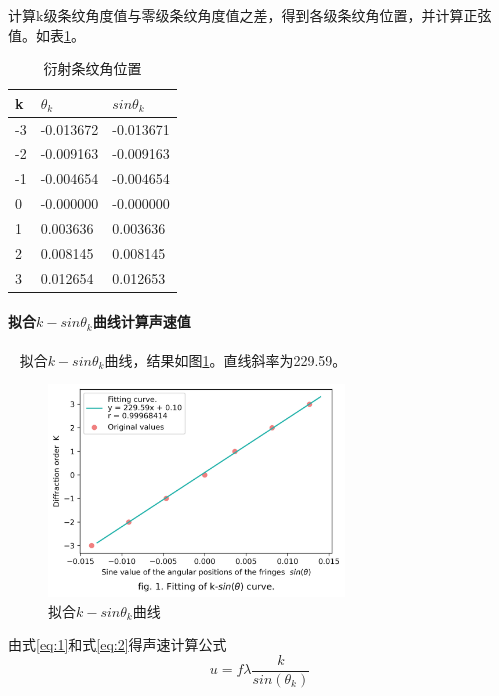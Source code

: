 \documentclass[12pt,a4paper,UTF8]{ctexart}
\begin{document}
		计算k级条纹角度值与零级条纹角度值之差，得到各级条纹角位置，并计算正弦值。如表\ref{tab:2}。
		\begin{table}[htbp]
			\centering
			\begin{tabular}{|l|l|l|}
			\hline
				k & $\theta_k$ & $sin\theta_k$ \\ \hline
				-3 & -0.013672 & -0.013671 \\ \hline
				-2 & -0.009163 & -0.009163 \\ \hline
				-1 & -0.004654 & -0.004654 \\ \hline
				0 & -0.000000 & -0.000000 \\ \hline
				1 & 0.003636 & 0.003636 \\ \hline
				2 & 0.008145 & 0.008145 \\ \hline
				3 & 0.012654 & 0.012653 \\ \hline
			\end{tabular}
			\caption{衍射条纹角位置}
			\label{tab:2}
		\end{table}
		
		\paragraph{拟合$k-sin\theta_k$曲线计算声速值}~
		\newline
		\indent
		拟合$k-sin\theta_k$曲线，结果如图\ref{fig:1}。直线斜率为229.59。
		\begin{figure}[htbp]
			\centering
			\includegraphics[width=0.7\textwidth]{attachments/fig.1.png}
			\caption{拟合$k-sin\theta_k$曲线}
			\label{fig:1}
		\end{figure}
		
		由式\ref{eq:1}和式\ref{eq:2}得声速计算公式
		\begin{equation}\label{eq:5}
			u = f\lambda\frac{k}{sin(\theta_k)}
		\end{equation}
		
\end{document}
